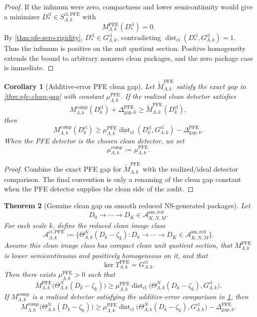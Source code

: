 \documentclass[11pt]{article}
\numberwithin{equation}{section}
\theoremstyle{plain}
\newtheorem{theorem}{Theorem}[section]
\newtheorem{corollary}[theorem]{Corollary}
\theoremstyle{definition}
\theoremstyle{remark}
\newcommand{\cl}{\mathrm{cl}}
\newcommand{\comp}{\mathrm{comp}}
\newcommand{\gap}{\mathrm{gap}}
\newcommand{\Dist}{\operatorname{dist}}
\newcommand{\A}{\mathcal A}
\begin{document}
\begin{proof}
If the infimum were zero, compactness and lower semicontinuity would give a
minimizer \(D_*^{\cl}\in S_{\Lambda,k}^{\cl,\mathrm{PFE}}\) with
\[
  M_{\Lambda,k}^{\mathrm{PFE}}(D_*^{\cl})=0.
\]
By \cref{thm:pfe-zero-rigidity}, \(D_*^{\cl}\in G_{\Lambda,k}^{\cl}\), contradicting
\(\Dist_{\cl}(D_*^{\cl},G_{\Lambda,k}^{\cl})=1\).  Thus the infimum is positive on
the unit quotient section.  Positive homogeneity extends the bound to
arbitrary nonzero clean packages, and the zero package case is immediate.
\end{proof}

\begin{corollary}[Additive-error PFE clean gap]\label{cor:pfe-additive-gap}
Let \(\widetilde M_{\Lambda,k}^{\mathrm{PFE}}\) satisfy the exact gap in
\cref{thm:pfe-clean-gap} with constant \(\mu_{\Lambda,k}^{\mathrm{PFE}}\).
If the realized clean detector satisfies
\[
  M_{\Lambda,k}^{\comp}(D_k^{\cl})+\Delta_{\gap,k}^{\mathrm{PFE}}
  \ge
  \widetilde M_{\Lambda,k}^{\mathrm{PFE}}(D_k^{\cl}),
\]
then
\[
  M_{\Lambda,k}^{\comp}(D_k^{\cl})
  \ge
  \mu_{\Lambda,k}^{\mathrm{PFE}}
  \Dist_{\cl}(D_k^{\cl},G_{\Lambda,k}^{\cl})
  -
  \Delta_{\gap,k}^{\mathrm{PFE}}.
\]
When the PFE detector is the chosen clean detector, we set
\[
  \mu_{\Lambda,k}^{\comp}:=\mu_{\Lambda,k}^{\mathrm{PFE}}.
\]
\end{corollary}

\begin{proof}
Combine the exact PFE gap for \(\widetilde M_{\Lambda,k}^{\mathrm{PFE}}\)
with the realized/ideal detector comparison.  The final convention is only a
renaming of the clean gap constant when the PFE detector supplies the clean
side of the audit.
\end{proof}

\begin{theorem}[Genuine clean gap on smooth reduced NS-generated packages]\label{thm:pfe-smred-gap}
Let
\[
  D_0\to\cdots\to D_K\in\A_{K,N,M}^{\mathrm{sm,red}}.
\]
For each scale \(k\), define the reduced clean image class
\[
  \A_{\Lambda,k}^{\cl,\mathrm{PFE}}
  :=
  \{\Theta_{\Lambda,k}^{N}(D_k-\zeta_k):
    D_0\to\cdots\to D_K\in\A_{K,N,M}^{\mathrm{sm,red}}\}.
\]
Assume this clean image class has compact clean unit quotient section, that
\(M_{\Lambda,k}^{\mathrm{PFE}}\) is lower semicontinuous and positively
homogeneous on it, and that
\[
  \ker T_{\Lambda,k}^{\mathrm{PFE}}=G_{\Lambda,k}^{\cl}.
\]
Then there exists \(\mu_{\Lambda,k}^{\mathrm{PFE}}>0\) such that
\[
  M_{\Lambda,k}^{\mathrm{PFE}}
  \bigl(\Theta_{\Lambda,k}^{N}(D_k-\zeta_k)\bigr)
  \ge
  \mu_{\Lambda,k}^{\mathrm{PFE}}
  \Dist_{\cl}
  \bigl(
    \Theta_{\Lambda,k}^{N}(D_k-\zeta_k),
    G_{\Lambda,k}^{\cl}
  \bigr).
\]
If \(M_{\Lambda,k}^{\comp}\) is a realized detector satisfying the
additive-error comparison in \cref{cor:pfe-additive-gap}, then
\[
  M_{\Lambda,k}^{\comp}
  \bigl(\Theta_{\Lambda,k}^{N}(D_k-\zeta_k)\bigr)
  \ge
  \mu_{\Lambda,k}^{\mathrm{PFE}}
  \Dist_{\cl}
  \bigl(
    \Theta_{\Lambda,k}^{N}(D_k-\zeta_k),
    G_{\Lambda,k}^{\cl}
  \bigr)
  -
  \Delta_{\gap,k}^{\mathrm{PFE}}.
\]
\end{theorem}
\end{document}
